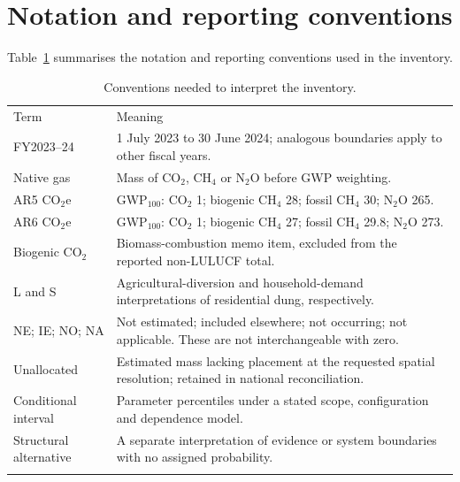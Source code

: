 \documentclass[essd]{copernicus}
\begin{document}
\appendix
\section{Notation and reporting conventions}
\label{app:notation}

Table~\ref{tab:notation} summarises the notation and reporting conventions used in the inventory.

\begin{table}[t]
\caption{Conventions needed to interpret the inventory.}
\label{tab:notation}
\small
\begin{tabular}{p{}p{}}
\tophline
Term & Meaning \\
\middlehline
FY2023--24 & 1 July 2023 to 30 June 2024; analogous boundaries apply to other fiscal years. \\
Native gas & Mass of CO$_2$, CH$_4$ or N$_2$O before GWP weighting. \\
AR5 CO$_2$e & GWP$_{100}$: CO$_2$ 1; biogenic CH$_4$ 28; fossil CH$_4$ 30; N$_2$O 265. \\
AR6 CO$_2$e & GWP$_{100}$: CO$_2$ 1; biogenic CH$_4$ 27; fossil CH$_4$ 29.8; N$_2$O 273. \\
Biogenic CO$_2$ & Biomass-combustion memo item, excluded from the reported non-LULUCF total. \\
L and S & Agricultural-diversion and household-demand interpretations of residential dung, respectively. \\
NE; IE; NO; NA & Not estimated; included elsewhere; not occurring; not applicable. These are not interchangeable with zero. \\
Unallocated & Estimated mass lacking placement at the requested spatial resolution; retained in national reconciliation. \\
Conditional interval & Parameter percentiles under a stated scope, configuration and dependence model. \\
Structural alternative & A separate interpretation of evidence or system boundaries with no assigned probability. \\
\bottomhline
\end{tabular}
\end{table}

\noappendix
\end{document}
